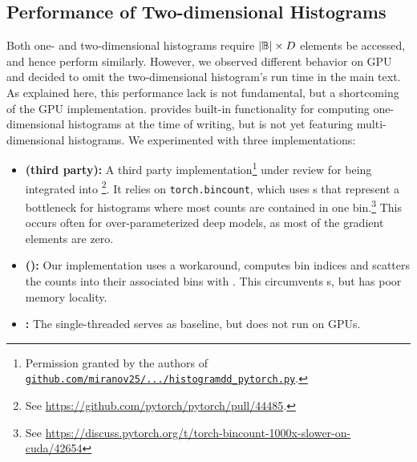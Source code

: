 \subsection{Performance of Two-dimensional Histograms}\label{cockpit::app:histograms}

Both one- and two-dimensional histograms require $|{\mathbb{B}}| \times D$ elements be
accessed, and hence perform similarly. However, we observed different behavior
on GPU and decided to omit the two-dimensional histogram's run time in the main
text. As explained here, this performance lack is not fundamental, but a
shortcoming of the GPU implementation. \pytorch provides built-in functionality
for computing one-dimensional histograms at the time of writing, but is not yet
featuring multi-dimensional histograms. We experimented with three
implementations:
\begin{itemize}
\item \textbf{\pytorch (third party):} A third party
  implementation\footnote{Permission granted by the authors of
    \href{cockpit::https://github.com/miranov25/RootInteractive/blob/7019e4c2b9f291551aeeb8677a969cfcfde690d1/RootInteractive/Tools/Histograms/histogramdd_pytorch.py}{\texttt{github.com/miranov25/.../histogramdd\_pytorch.py}}.}
  under review for being integrated into \pytorch\footnote{See
    \url{https://github.com/pytorch/pytorch/pull/44485}.}. It relies on
  \texttt{torch.bincount}, which uses s that represent a
  bottleneck for histograms where most counts are contained in one
  bin.\footnote{See
    \mbox{\url{https://discuss.pytorch.org/t/torch-bincount-1000x-slower-on-cuda/42654}}}
  This occurs often for over-parameterized deep models, as most of the gradient
  elements are zero.

\item \textbf{\pytorch (\cockpittitle):} Our implementation uses a workaround,
  computes bin indices and scatters the counts into their associated bins with
  . This circumvents s, but
  has poor memory locality.

\item \textbf{\numpy:} The single-threaded  serves
  as baseline, but does not run on GPUs.
\end{itemize}



